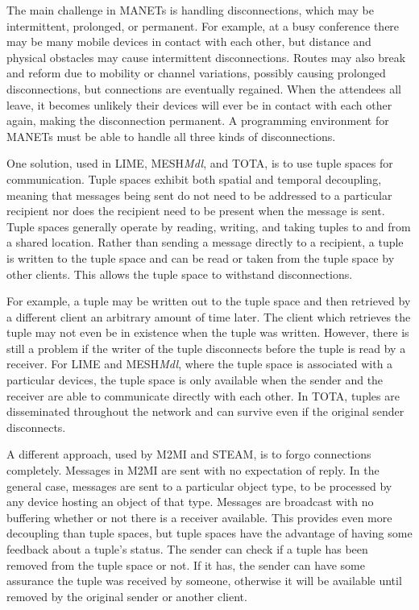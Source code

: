 The main challenge in MANETs is handling disconnections, which may be intermittent, prolonged, or permanent. For example, at a busy conference there may be many mobile devices in contact with each other, but distance and physical obstacles may cause intermittent disconnections. Routes may also break and reform due to mobility or channel variations, possibly causing prolonged disconnections, but connections are eventually regained. When the attendees all leave, it becomes unlikely their devices will ever be in contact with each other again, making the disconnection permanent. A programming environment for MANETs must be able to handle all three kinds of disconnections.

One solution, used in LIME, MESH\textit{Mdl}, and TOTA, is to use tuple spaces for communication. Tuple spaces exhibit both spatial and temporal decoupling, meaning that messages being sent do not need to be addressed to a particular recipient nor does the recipient need to be present when the message is sent. Tuple spaces generally operate by reading, writing, and taking tuples to and from a shared location. Rather than sending a message directly to a recipient, a tuple is written to the tuple space and can be read or taken from the tuple space by other clients. This allows the tuple space to withstand disconnections.

For example, a tuple may be written out to the tuple space and then retrieved by a different client an arbitrary amount of time later. The client which retrieves the tuple may not even be in existence when the tuple was written. However, there is still a problem if the writer of the tuple disconnects before the tuple is read by a receiver. For LIME and MESH\textit{Mdl}, where the tuple space is associated with a particular devices, the tuple space is only available when the sender and the receiver are able to communicate directly with each other. In TOTA, tuples are disseminated throughout the network and can survive even if the original sender disconnects.

A different approach, used by M2MI and STEAM, is to forgo connections completely. Messages in M2MI are sent with no expectation of reply. In the general case, messages are sent to a particular object type, to be processed by any device hosting an object of that type. Messages are broadcast with no buffering whether or not there is a receiver available. This provides even more decoupling than tuple spaces, but tuple spaces have the advantage of having some feedback about a tuple's status. The sender can check if a tuple has been removed from the tuple space or not. If it has, the sender can have some assurance the tuple was received by someone, otherwise it will be available until removed by the original sender or another client.


